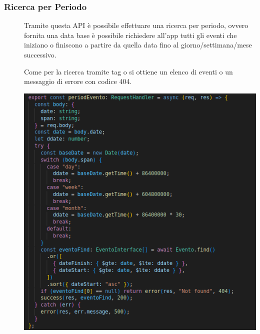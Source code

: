 \documentclass{article}
\begin{document}
\subsubsection{Ricerca per Periodo}
\begin{description}
    \item[] Tramite questa API è possibile effettuare una ricerca per periodo, ovvero fornita una data base è possibile richiedere all'app tutti gli eventi che iniziano o finiscono a partire da quella data fino al giorno/settimana/mese successivo.
    \item[] Come per la ricerca tramite tag o si ottiene un elenco di eventi o un messaggio di errore con codice 404.
    \item[] \begin{center}
            \includegraphics[scale=0.5]{periodoEvent.png}
        \end{center}
\end{description}
\clearpage
\end{document}
